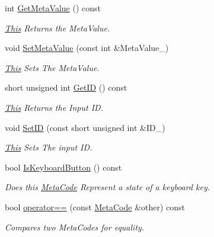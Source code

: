 \begin{DoxyCompactItemize}
int \hyperlink{classphys_1_1MetaCode_ad8e7e4e7c6cdc6a05b8522910ce90cd4}{GetMetaValue} () const 
\begin{DoxyCompactList}\small\item\em \hyperlink{structThis}{This} Returns the MetaValue. \item\end{DoxyCompactList}\item 
void \hyperlink{classphys_1_1MetaCode_a31a6390626b08c1bbf08e3f68d2ea764}{SetMetaValue} (const int \&MetaValue\_\-)
\begin{DoxyCompactList}\small\item\em \hyperlink{structThis}{This} Sets The MetaValue. \item\end{DoxyCompactList}\item 
short unsigned int \hyperlink{classphys_1_1MetaCode_a70389ebd99493248fe93c598e2fe06c9}{GetID} () const 
\begin{DoxyCompactList}\small\item\em \hyperlink{structThis}{This} Returns the Input ID. \item\end{DoxyCompactList}\item 
void \hyperlink{classphys_1_1MetaCode_a0ef70c11c06f0e3015121985cb1b6153}{SetID} (const short unsigned int \&ID\_\-)
\begin{DoxyCompactList}\small\item\em \hyperlink{structThis}{This} Sets The input ID. \item\end{DoxyCompactList}\item 
bool \hyperlink{classphys_1_1MetaCode_ad86e1599eccea8edecb721eb84c06c72}{IsKeyboardButton} () const 
\begin{DoxyCompactList}\small\item\em Does this \hyperlink{classphys_1_1MetaCode}{MetaCode} Represent a state of a keyboard key. \item\end{DoxyCompactList}\item 
bool \hyperlink{classphys_1_1MetaCode_a506486e5a6f08d50a5af42fa6d48a7f5}{operator==} (const \hyperlink{classphys_1_1MetaCode}{MetaCode} \&other) const 
\begin{DoxyCompactList}\small\item\em Compares two MetaCodes for equality. \item\end{DoxyCompactList}\end{DoxyCompactItemize}



